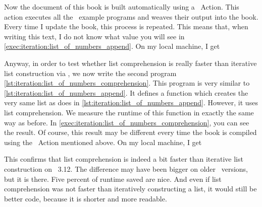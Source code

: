 Now the  document of this book is built automatically using a \github~Action.
This action executes all the \python\ example programs and weaves their output into the book.
Every time I update the book, this process is repeated.
This means that, when writing this text, I do not know what value you will see in \cref{exec:iteration:list_of_numbers_append}.
On my local machine, I get 

Anyway, in order to test whether list comprehension is really faster than iterative list construction via , we now write the second program \cref{lst:iteration:list_of_numbers_comprehension}.
This program is very similar to \cref{lst:iteration:list_of_numbers_append}.
It defines a function  which creates the very same list as  does in \cref{lst:iteration:list_of_numbers_append}.
However, it uses list comprehension.
We measure the runtime of this function in exactly the same way as before.
In \cref{exec:iteration:list_of_numbers_comprehension}, you can see the result.
Of course, this result may be different every time the book is compiled using the \github~Action mentioned above.
On my local machine, I get 

This confirms that list comprehension is indeed a bit faster than iterative list construction on \python~3.12.
The difference may have been bigger on older \python\ versions, but it is there.
Five percent of runtime saved are nice.
And even if list comprehension was not faster than iteratively constructing a list, it would still be better code, because it is shorter and more readable.

